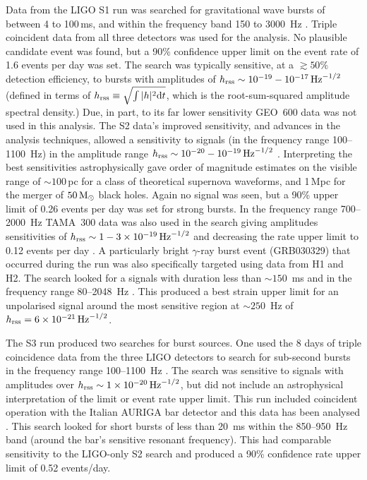 \documentclass{article}
\begin{document}
Data from the LIGO S1 run was searched for gravitational wave bursts of between
4 to 100\,ms, and within the frequency band 150 to 3000~Hz \cite{Abbott:2004b}.
Triple coincident data from all three detectors was used for the analysis. No
plausible candidate event was found, but a 90\% confidence upper limit on the
event rate of 1.6 events per day was set. The search was typically
sensitive, at a $\gtrsim50\%$ detection efficiency, to bursts with amplitudes of
$h_{\rm rss}\sim10^{-19}-10^{-17}\,{\rm Hz}^{-1/2}$ (defined in terms of $h_{\rm
rss} \equiv \sqrt{\int|h|^2{\rm d}t}$, which is the root-sum-squared amplitude
spectral density.) Due, in part, to its far lower sensitivity GEO~600 data was
not used in this analysis. The S2 data's improved sensitivity, and advances in
the analysis techniques, allowed a sensitivity to signals (in the frequency
range 100--1100~Hz) in the amplitude range $h_{\rm
rss}\sim10^{-20}-10^{-19}\,{\rm Hz}^{-1/2}$ \cite{Abbott:2005a}. Interpreting
the best sensitivities astrophysically gave order of magnitude estimates on
the visible range of $\sim100$\,pc for a class of theoretical supernova
waveforms, and 1\,Mpc for the merger of $50\,{\rm M}_{\odot}$ black holes. Again
no signal was seen, but a 90\% upper limit of 0.26 events per day was set for
strong bursts. In the frequency range 700--2000~Hz TAMA~300 data was also used
in the search giving amplitudes sensitivities of $h_{\rm
rss}\sim1-3\times10^{-19}\,{\rm Hz}^{-1/2}$ and decreasing the rate upper limit
to 0.12 events per day \cite{Abbott:2005c}. A particularly bright $\gamma$-ray
burst event (GRB030329) that occurred during the run was also specifically
targeted using data from H1 and H2. The search looked for a signals with
duration less than $\sim 150$~ms and in the frequency range 80--2048~Hz
\cite{Abbott:2005d}. This produced a best strain upper limit for an unpolarised
signal around the most sensitive region at  $\sim250$~Hz of $h_{\rm
rss}=6\times10^{-21}\,{\rm Hz}^{-1/2}$.

The S3 run produced two searches for burst sources. One used the 8 days of
triple coincidence data from the three LIGO detectors to search for sub-second
bursts in the frequency range 100--1100~Hz \cite{Abbott:2006a}. The search was
sensitive to signals with amplitudes over $h_{\rm rss}\sim1\times10^{-20}\,{\rm
Hz}^{-1/2}$, but did not include an astrophysical interpretation of the limit or
event rate upper limit. This run included coincident operation with the Italian
AURIGA bar detector and this data has been analysed \cite{Baggio:2008}. This
search looked for short bursts of less than 20~ms within the 850--950~Hz band
(around the bar's sensitive resonant frequency). This had comparable sensitivity
to the LIGO-only S2 search and produced a 90\% confidence rate upper limit of
0.52 events/day.
\end{document}
